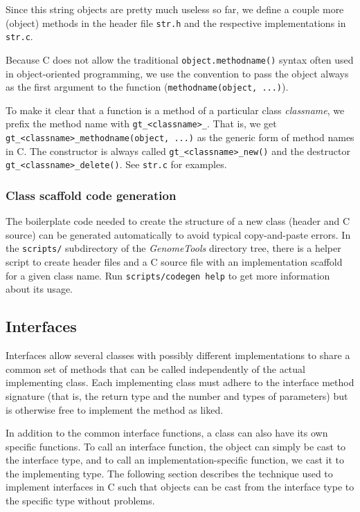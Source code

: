 \documentclass[11pt,final]{article}
\newcommand{\keyword}[1]{\lstinline{#1}}
\newcommand{\Gt}[0]{\emph{GenomeTools}\xspace}
\begin{document}
Since this string objects are pretty much useless so far, we define a couple
more (object) methods in the header file \keyword{str.h} and the respective
implementations in \keyword{str.c}.

Because C does not allow the traditional \keyword{object.methodname()} syntax
often used in object-oriented programming, we use the convention to pass the
object always as the first argument to the function
(\keyword{methodname(object, ...)}).

To make it clear that a function is a method of a particular class
\emph{classname}, we prefix the method name with \keyword{gt_<classname>_}.
That is, we get \keyword{gt_<classname>_methodname(object, ...)} as the generic
form of method names in C. The constructor is always called
\keyword{gt_<classname>_new()} and the destructor
\keyword{gt_<classname>_delete()}. See \keyword{str.c} for examples.

\subsubsection{Class scaffold code generation}
The boilerplate code needed to create the structure of a new class (header and
C source) can be generated automatically to avoid typical copy-and-paste errors.
In the \keyword{scripts/} subdirectory of the \Gt directory tree, there is a
helper script to create header files and a C source file with an implementation
scaffold for a given class name. Run \keyword{scripts/codegen help} to get more
information about its usage.

\subsection{Interfaces}

Interfaces allow several classes with possibly different implementations to
share a common set of methods that can be called independently of the actual
implementing class. Each implementing class must adhere to the interface method
signature (that is, the return type and the number and types of parameters) but
is otherwise free to implement the method as liked.

In addition to the common interface functions, a class can also have its own
specific functions. To call an interface function, the object can simply be
cast to the interface type, and to call an implementation-specific function,
we cast it to the implementing type.
The following section describes the technique used to implement interfaces in C
such that objects can be cast from the interface type to the specific type
without problems.
\end{document}
